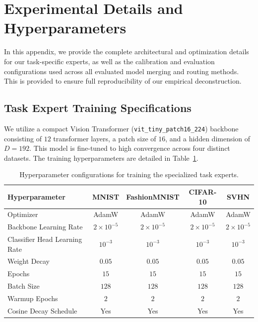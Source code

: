 \documentclass{article}
\theoremstyle{plain}
\theoremstyle{definition}
\theoremstyle{remark}
\begin{document}










\newpage
\appendix
\onecolumn
\section{Experimental Details and Hyperparameters}
\label{sec:appendix_details}

In this appendix, we provide the complete architectural and optimization details for our task-specific experts, as well as the calibration and evaluation configurations used across all evaluated model merging and routing methods. This is provided to ensure full reproducibility of our empirical deconstruction.

\subsection{Task Expert Training Specifications}
We utilize a compact Vision Transformer (\texttt{vit\_tiny\_patch16\_224}) backbone consisting of $12$ transformer layers, a patch size of $16$, and a hidden dimension of $D = 192$. This model is fine-tuned to high convergence across four distinct datasets. The training hyperparameters are detailed in Table~\ref{tab:expert_hyperparams}.

\begin{table}[h]
\centering
\caption{Hyperparameter configurations for training the specialized task experts.}
\label{tab:expert_hyperparams}
\vskip 0.15in
\begin{tabular}{lcccc}
\toprule
Hyperparameter & MNIST & FashionMNIST & CIFAR-10 & SVHN \\
\midrule
Optimizer & AdamW & AdamW & AdamW & AdamW \\
Backbone Learning Rate & $2\times 10^{-5}$ & $2\times 10^{-5}$ & $2\times 10^{-5}$ & $2\times 10^{-5}$ \\
Classifier Head Learning Rate & $10^{-3}$ & $10^{-3}$ & $10^{-3}$ & $10^{-3}$ \\
Weight Decay & $0.05$ & $0.05$ & $0.05$ & $0.05$ \\
Epochs & $15$ & $15$ & $15$ & $15$ \\
Batch Size & $128$ & $128$ & $128$ & $128$ \\
Warmup Epochs & $2$ & $2$ & $2$ & $2$ \\
Cosine Decay Schedule & Yes & Yes & Yes & Yes \\
\bottomrule
\end{tabular}
\end{table}
\end{document}

